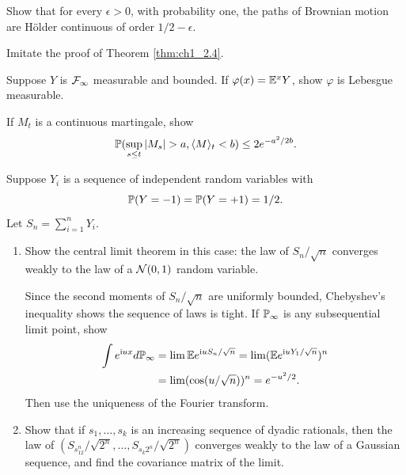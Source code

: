 \begin{exercise}\label{ex:ch1_11}
Show that for every $\epsilon > 0$, with probability one, the paths of Brownian motion are H\"older continuous of order $1/2 - \epsilon$.

\hint Imitate the proof of Theorem \ref{thm:ch1_2.4}.
\end{exercise}

\begin{exercise}\label{ex:ch1_12}
Suppose $Y$ is $\FC_\infty$ measurable and bounded. If $\varphi(x) = \E^x Y$, show $\varphi$ is Lebesgue measurable.
\end{exercise}

\begin{exercise}\label{ex:ch1_13}
If $M_t$ is a continuous martingale, show
\[
    \P(\sup_{s\leq t} |M_s| > a, \lrang{M}_t < b) \leq 2e^{-a^2/2b}.
\]
\end{exercise}

\begin{exercise}\label{ex:ch1_14}
Suppose $Y_i$ is a sequence of independent random variables with
\[
    \P(Y = -1) = \P(Y = +1) = 1/2.
\]
Let $S_n = \sum_{i=1}^n Y_i$.

\begin{enumerate}
    \item Show the central limit theorem in this case: the law of $S_n/\sqrt{n}$ converges weakly to the law of a $\NC(0,1)$ random variable.

    \hint Since the second moments of $S_n/\sqrt{n}$ are uniformly bounded, Chebyshev's inequality shows the sequence of laws is tight. If $\P_\infty$ is any subsequential limit point, show
    \begin{align*}
        \int e^{\im ux}d\P_\infty &= \lim \E e^{\im uS_n/\sqrt{n}} = \lim(\E e^{\im uY_1/\sqrt{n}})^n \\
        &= \lim(\cos(u/\sqrt{n}))^n = e^{-u^2/2}.
    \end{align*}
    Then use the uniqueness of the Fourier transform.


    \item Show that if $s_1,\ldots,s_k$ is an increasing sequence of dyadic rationals, then the law of $(S_{s_12^n}/\sqrt{2^n},\ldots,S_{s_k2^n}/\sqrt{2^n})$ converges weakly to the law of a Gaussian sequence, and find the covariance matrix of the limit.
\end{enumerate}
\end{exercise}

